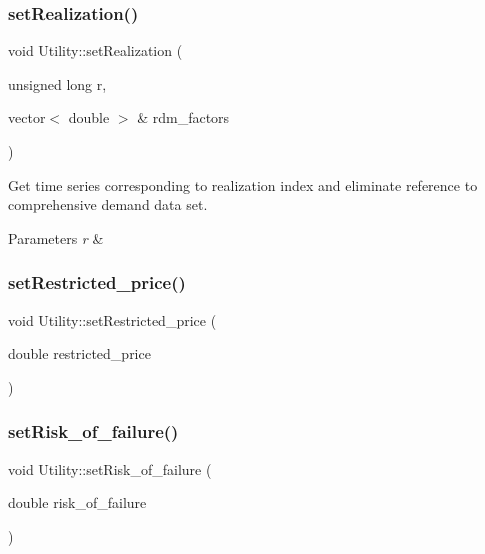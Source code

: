 \subsubsection{\texorpdfstring{set\+Realization()}{setRealization()}}
{\footnotesize\ttfamily void Utility\+::set\+Realization (\begin{DoxyParamCaption}\item[{unsigned long}]{r,  }\item[{vector$<$ double $>$ \&}]{rdm\+\_\+factors }\end{DoxyParamCaption})}

Get time series corresponding to realization index and eliminate reference to comprehensive demand data set. 
\begin{DoxyParams}{Parameters}
{\em r} & \\
\hline
\end{DoxyParams}
\mbox{\label{classUtility_a7f642d886a6d1d165e86b2e6a7c51ed4}} 
\subsubsection{\texorpdfstring{set\+Restricted\+\_\+price()}{setRestricted\_price()}}
{\footnotesize\ttfamily void Utility\+::set\+Restricted\+\_\+price (\begin{DoxyParamCaption}\item[{double}]{restricted\+\_\+price }\end{DoxyParamCaption})}

\mbox{\label{classUtility_a68d5088951f6bdccbb7af18ea8f153f5}} 
\subsubsection{\texorpdfstring{set\+Risk\+\_\+of\+\_\+failure()}{setRisk\_of\_failure()}}
{\footnotesize\ttfamily void Utility\+::set\+Risk\+\_\+of\+\_\+failure (\begin{DoxyParamCaption}\item[{double}]{risk\+\_\+of\+\_\+failure }\end{DoxyParamCaption})}


